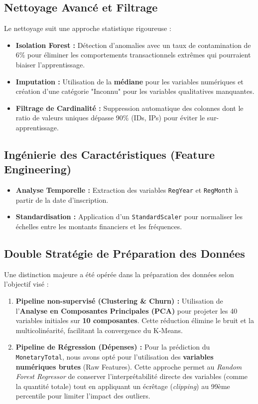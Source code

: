\documentclass[11pt,a4paper]{article}
\begin{document}
\subsection{Nettoyage Avancé et Filtrage}
Le nettoyage suit une approche statistique rigoureuse :
\begin{itemize}
    \item \textbf{Isolation Forest :} Détection d'anomalies avec un taux de contamination de 6\% pour éliminer les comportements transactionnels extrêmes qui pourraient biaiser l'apprentissage.
    \item \textbf{Imputation :} Utilisation de la \textbf{médiane} pour les variables numériques et création d'une catégorie "Inconnu" pour les variables qualitatives manquantes.
    \item \textbf{Filtrage de Cardinalité :} Suppression automatique des colonnes dont le ratio de valeurs uniques dépasse 90\% (IDs, IPs) pour éviter le sur-apprentissage.
\end{itemize}

\subsection{Ingénierie des Caractéristiques (Feature Engineering)}
\begin{itemize}
    \item \textbf{Analyse Temporelle :} Extraction des variables \texttt{RegYear} et \texttt{RegMonth} à partir de la date d'inscription.
    \item \textbf{Standardisation :} Application d'un \texttt{StandardScaler} pour normaliser les échelles entre les montants financiers et les fréquences.
\end{itemize}

\subsection{Double Stratégie de Préparation des Données}
Une distinction majeure a été opérée dans la préparation des données selon l'objectif visé :

\begin{enumerate}
    \item \textbf{Pipeline non-supervisé (Clustering \& Churn) :} Utilisation de l'\textbf{Analyse en Composantes Principales (PCA)} pour projeter les 40 variables initiales sur \textbf{10 composantes}. Cette réduction élimine le bruit et la multicolinéarité, facilitant la convergence du K-Means.
    \item \textbf{Pipeline de Régression (Dépenses) :} Pour la prédiction du \texttt{MonetaryTotal}, nous avons opté pour l'utilisation des \textbf{variables numériques brutes} (Raw Features). Cette approche permet au \textit{Random Forest Regressor} de conserver l'interprétabilité directe des variables (comme la quantité totale) tout en appliquant un écrêtage (\textit{clipping}) au 99ème percentile pour limiter l'impact des outliers.
\end{enumerate}
\end{document}
